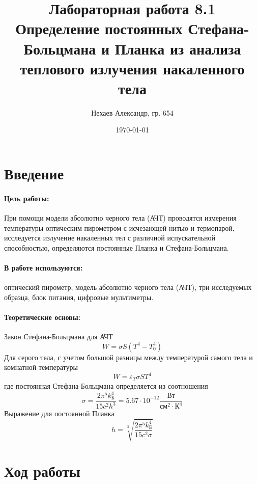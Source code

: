 \documentclass[a4paper, 12pt]{article}
\title{Лабораторная работа 8.1\\Определение постоянных Стефана-Больцмана и Планка из анализа теплового излучения накаленного тела}
\author{Нехаев Александр, гр. 654}
\date{\today}
\begin{document}
    \maketitle
    \newpage
    \tableofcontents
    \newpage
    \section{Введение}
    \paragraph{Цель работы:}
    При помощи модели абсолютно черного тела (АЧТ) проводятся измерения температуры оптическим пирометром с исчезающей нитью и термопарой, исследуется излучение накаленных тел с различной испускательной способностью, определяются постоянные Планка и Стефана-Больцмана.
    \paragraph{В работе используются:}
    оптический пирометр, модель абсолютно черного тела (АЧТ), три исследуемых образца, блок питания, цифровые мультиметры.
    \paragraph{Теоретические основы:}
    Закон Стефана-Больцмана для АЧТ
    \begin{equation}
    	W=\sigma S \left(T^4-T_0^4\right)
    \end{equation}
    Для серого тела, с учетом большой разницы между температурой самого тела и комнатной температуры
    \begin{equation}
    	W=\varepsilon_T\sigma S T^4
    \end{equation}
    где постоянная Стефана-Больцмана определяется из соотношения
    \begin{equation}
    	\sigma=\frac{2\pi^5 k_\text{Б}^4}{15c^2h^3}=5.67\cdot 10^{-12}\frac{\text{Вт}}{\text{см}^2\cdot \text{К}^4}
    \end{equation}
    Выражение для постоянной Планка
    \begin{equation}
    	h=\sqrt[3]{\frac{2\pi^5 k_{\text{Б}}^4}{15c^2\sigma}}
    \end{equation}
    \section{Ход работы}
\end{document}
